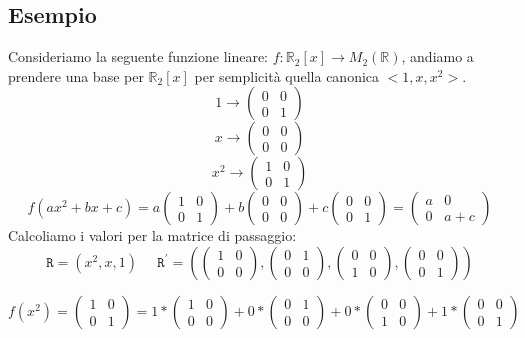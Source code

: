 \subsection{Esempio}
Consideriamo la seguente funzione lineare: $f: \mathbb{R}_2[x] \rightarrow M_2(\mathbb{R})$, andiamo a prendere una base per $\mathbb{R}_2[x]$ per semplicità quella canonica $<1,x,x^2>$.
$$ 1 \rightarrow \begin{pmatrix}0 & 0 \\ 0 & 1 \end{pmatrix} $$
$$ x \rightarrow \begin{pmatrix}0 & 0 \\ 0 & 0 \end{pmatrix} $$
$$ x^2 \rightarrow \begin{pmatrix}1 & 0 \\ 0 & 1 \end{pmatrix} $$
$$ f(ax^2+bx+c) = a\begin{pmatrix}1 & 0 \\ 0 & 1 \end{pmatrix} +b \begin{pmatrix}0 & 0 \\ 0 & 0 \end{pmatrix} +c \begin{pmatrix}0 & 0 \\ 0 & 1 \end{pmatrix} = \begin{pmatrix} a & 0 \\ 0 & a+c \end{pmatrix}  $$
Calcoliamo i valori per la matrice di passaggio:
$$ 
\mathtt{R}=(x^2,x,1) \;\;\;\;\; \mathtt{R}^{\prime}=(
\begin{pmatrix}
1 & 0 \\ 0 & 0
\end{pmatrix},
\begin{pmatrix}
0 & 1 \\ 0 & 0
\end{pmatrix},
\begin{pmatrix}
0 & 0 \\ 1 & 0
\end{pmatrix},
\begin{pmatrix}
0 & 0 \\ 0 & 1
\end{pmatrix}) $$

$$ f(x^2) = \begin{pmatrix}1 & 0 \\ 0 & 1 \end{pmatrix} = 1*\begin{pmatrix}
1 & 0 \\ 0 & 0
\end{pmatrix}
+0*
\begin{pmatrix}
0 & 1 \\ 0 & 0
\end{pmatrix}
+0*
\begin{pmatrix}
0 & 0 \\ 1 & 0
\end{pmatrix}
+1*
\begin{pmatrix}
0 & 0 \\ 0 & 1
\end{pmatrix} $$

